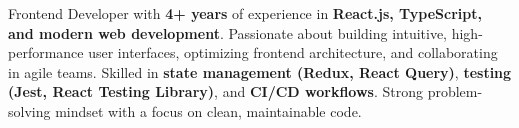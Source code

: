 \vspace{3pt}
Frontend Developer with \textbf{4+ years} of experience in \textbf{React.js, TypeScript, and modern web development}. Passionate about building intuitive, high-performance user interfaces, optimizing frontend architecture, and collaborating in agile teams. Skilled in \textbf{state management (Redux, React Query)}, \textbf{testing (Jest, React Testing Library)}, and \textbf{CI/CD workflows}. Strong problem-solving mindset with a focus on clean, maintainable code.
